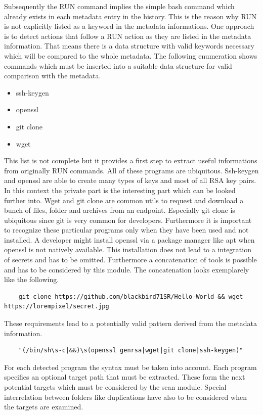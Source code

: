 Subsequently the RUN command implies the simple bash command which already exists in each metadata entry in the history. 
This is the reason why RUN is not explicitly listed as a keyword in the metadata informations. 
One approach is to detect actions that follow a RUN action as they are listed in the metadata information. 
That means there is a data structure with valid keywords necessary which will be compared to the whole metadata.
The following enumeration shows commands which must be inserted into a suitable data structure for valid comparison with the metadata.
\begin{itemize}
\item ssh-keygen
\item openssl
\item git clone
\item wget
\end{itemize}
This list is not complete but it provides a first step to extract useful informations from originally RUN commands. 
All of these programs are ubiquitous.
Ssh-keygen and openssl are able to create many types of keys and most of all RSA key pairs. 
In this context the private part is the interesting part which can be looked further into.
Wget and git clone are common utils to request and download a bunch of files, folder and archives from an endpoint. 
Especially git clone is ubiquitous since git is very common for developers.
Furthermore it is important to recognize these particular programs only when they have been used and not installed.
A developer might install openssl via a package manager like apt when openssl is not natively available.
This installation does not lead to a integration of secrets and has to be omitted.
Furthermore a concatenation of tools is possible and has to be considered by this module. 
The concatenation looks exemplarely like the following.
\begin{lstlisting}
	git clone https://github.com/blackbird71SR/Hello-World && wget https://lorempixel/secret.jpg
\end{lstlisting}

These requirements lead to a potentially valid pattern derived from the metadata information.
\begin{lstlisting}
	"(/bin/sh\s-c|&&)\s(openssl genrsa|wget|git clone|ssh-keygen)"
\end{lstlisting}

For each detected program the syntax must be taken into account. 
Each program specifies an optional target path that must be extracted. 
These form the next potential targets which must be considered by the scan module. 
Special interrelation between folders like duplications have also to be considered when the targets are examined.

